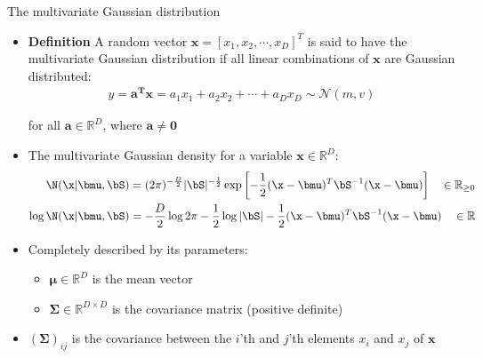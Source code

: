 \begin{frame}{The multivariate Gaussian distribution}
\vspace*{-0.4cm}
{\small
\begin{itemize}
	\setlength{\itemsep}{4mm}
	\item {\bf Definition} A random vector $\bm{x} = \left[x_1, x_2, \cdots, x_D\right]^T$ is said to have the multivariate Gaussian distribution if all linear combinations of $\bm{x}$ are Gaussian distributed:
	\begin{align}
		y = \bm{a^T}\bm{x} = a_1x_1 + a_2x_2 + \cdots + a_D x_D \sim \mathcal{N}\left(m, v\right)
	\end{align}

	for all $\bm{a} \in \mathbb{R}^D$, where $\bm{a} \neq \bm{0}$

    \pause

	\item The multivariate Gaussian density for a variable $\bm{x} \in \mathbb{R}^D$:
	\begin{align}
		\N(\x | \bmu, \bS ) &= (2\pi)^{-\frac{D}{2}} | \bS |^{-\frac{1}{2}} \exp\left[-\frac12(\x - \bmu)^T \bS^{-1} (\x - \bmu) \right] \quad \in \R_{\ge 0} \\   
		\log \N(\x | \bmu, \bS ) &= -\frac{D}{2} \log 2\pi - \frac{1}{2} \log | \bS | -\frac{1}{2} (\x - \bmu)^T \bS^{-1} (\x - \bmu) \quad \in \R
	\end{align}

    \pause

	\item Completely described by its parameters:
	\vspace*{2mm}
	\begin{itemize}
		\setlength{\itemsep}{4mm}
		\item $\bm{\mu} \in \mathbb{R}^D$ is the mean vector
		\item $\bm{\Sigma} \in \mathbb{R}^{D\times D}$ is the covariance matrix (positive definite)
	\end{itemize}
	
	\pause
	
	\item $\left( \bm{\Sigma}\right)_{ij}$ is the covariance between the $i$'th and $j$'th elements $x_i$ and $x_j$ of $\bm{x}$
	
\end{itemize}
}
\end{frame}


